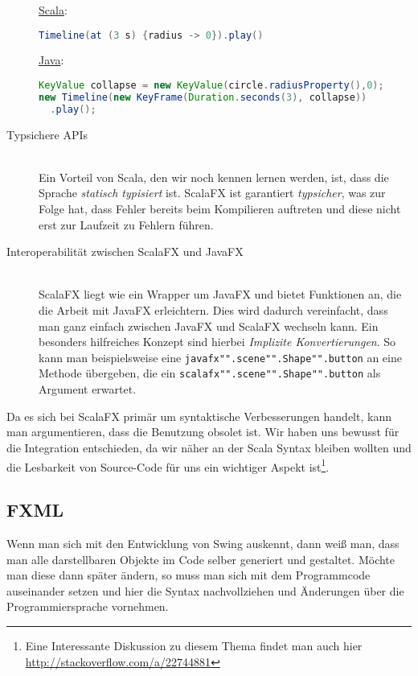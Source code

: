 \begin{description}
\underline{Scala}:
\begin{lstlisting}[language=scala,caption=Scala Beispiel für eine einface Animation,numbers=none]
Timeline(at (3 s) {radius -> 0}).play()
\end{lstlisting}

\underline{Java}:
\begin{lstlisting}[language=Java,caption=Das selbe Beispiel in Java,numbers=none]
KeyValue collapse = new KeyValue(circle.radiusProperty(),0);
new Timeline(new KeyFrame(Duration.seconds(3), collapse))
  .play();
\end{lstlisting}

\item[Typsichere APIs]\hfill\\
Ein Vorteil von Scala, den wir noch kennen lernen werden, ist, dass die Sprache \textit{statisch typisiert} ist. ScalaFX ist garantiert \textit{typsicher}, was zur Folge hat, dass Fehler bereits beim Kompilieren auftreten und diese nicht erst zur Laufzeit zu Fehlern führen. ~\cite{TypesAndProgrammingLanguages}

\item[Interoperabilität zwischen ScalaFX und JavaFX]\hfill\\
ScalaFX liegt wie ein Wrapper um JavaFX und bietet Funktionen an, die die Arbeit mit JavaFX erleichtern. Dies wird dadurch vereinfacht, dass man ganz einfach zwischen JavaFX und ScalaFX wechseln kann. Ein besonders hilfreiches Konzept sind hierbei \textit{Implizite Konvertierungen}. So kann man beispielsweise eine \texttt{javafx"".scene"".Shape"".button} an eine Methode übergeben, die ein \texttt{scalafx"".scene"".Shape"".button} als Argument erwartet.
\end{description}

Da es sich bei ScalaFX primär um syntaktische Verbesserungen handelt, kann man argumentieren, dass die Benutzung obsolet ist. Wir haben uns bewusst für die Integration entschieden, da wir näher an der Scala Syntax bleiben wollten und die Lesbarkeit von Source-Code für uns ein wichtiger Aspekt ist\footnote{Eine Interessante Diskussion zu diesem Thema findet man auch hier \url{http://stackoverflow.com/a/22744881}}.


\subsection{FXML}\label{sec:fxml}
Wenn man sich mit den Entwicklung von Swing auskennt, dann weiß man, dass man alle darstellbaren Objekte im Code selber generiert und gestaltet. Möchte man diese dann später ändern, so muss man sich mit dem Programmcode auseinander setzen und hier die Syntax nachvollziehen und Änderungen über die Programmiersprache vornehmen.

